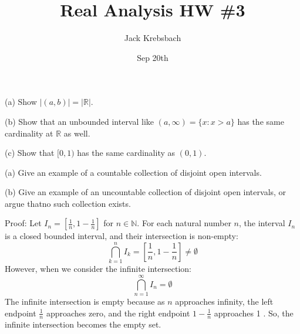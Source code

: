 \documentclass{report}
\title{Real Analysis HW \#3}
\author{Jack Krebsbach }
\date{Sep 20th}
\begin{document}
\maketitle




(a) Show $|(a, b)|=|\mathbb{R}|$.

\par \bigskip
(b) Show that an unbounded interval like $(a, \infty)=\{x: x>a\}$ has the same cardinality at $\mathbb{R}$ as well.

\par \bigskip
(c) Show that $[0,1)$ has the same cardinality as $(0,1)$.

\sol


 (a) Give an example of a countable collection of disjoint open intervals.
\par \bigskip

\par \bigskip

 (b) Give an example of an uncountable collection of disjoint open intervals, or argue thatno such collection exists.



Proof: Let $I_n=\left[\frac{1}{n}, 1-\frac{1}{n}\right]$ for $n \in \mathbb{N}$.
For each natural number $n$, the interval $I_n$ is a closed bounded interval, and their intersection is non-empty:
$$
\bigcap_{k=1}^n I_k=\left[\frac{1}{n}, 1-\frac{1}{n}\right] \neq \emptyset
$$
However, when we consider the infinite intersection:
$$
\bigcap_{n=1}^{\infty} I_n=\emptyset
$$
The infinite intersection is empty because as $n$ approaches infinity, the left endpoint $\frac{1}{n}$ approaches zero, and the right endpoint $1-\frac{1}{n}$ approaches 1 . So, the infinite intersection becomes the empty set.
\end{document}

